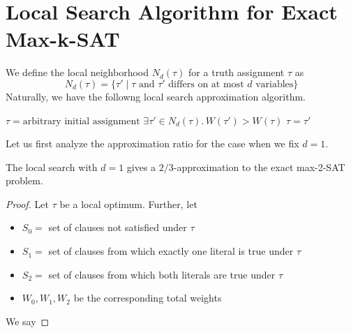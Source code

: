 \section{Local Search Algorithm for Exact Max-k-SAT}

We define the local neighborhood $N_d(\tau)$ for a truth assignment $\tau$ as
$$
N_d(\tau) = \{ \tau' \mid \text{$\tau$ and $\tau'$ differs on at most $d$ variables}\}
$$
Naturally, we have the followng local search approximation algorithm.

\begin{codebox}
    \li $\tau = \text{arbitrary initial assignment}$
    \li \While $\exists \tau' \in N_d(\tau).\, W(\tau') > W(\tau)$ \Do
        \li $\tau = \tau'$ 
\end{codebox}

Let us first analyze the approximation ratio for the case when we fix $d=1$.

\begin{theorem}
    The local search with $d=1$ gives a $2/3$-approximation to the exact max-2-SAT problem. 
\end{theorem}

\begin{proof}
    Let $\tau$ be a local optimum. Further, let
    \begin{itemize}
        \item $S_0 =$ set of clauses not satisfied under $\tau$ 
        \item $S_1 =$ set of clauses from which exactly one literal is true under $\tau$ 
        \item $S_2 =$ set of clauses from which both literals are true under $\tau$
        \item $W_0,W_1,W_2$ be the corresponding total weights
    \end{itemize}
    We say 
\end{proof}